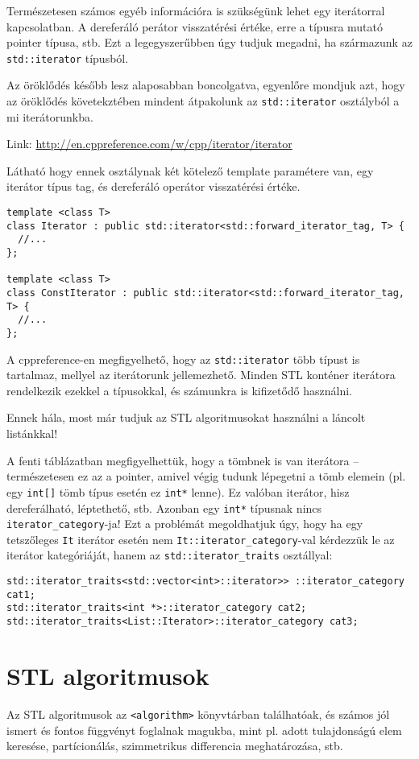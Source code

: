 \documentclass[../cpp_book/cpp_book.tex]{subfiles}
\begin{document}
	\smallskip
	Természetesen számos egyéb információra is szükségünk lehet egy iterátorral kapcsolatban. A dereferáló perátor visszatérési értéke, erre a típusra mutató pointer típusa, stb. Ezt a legegyszerűbben úgy tudjuk megadni, ha származunk az \texttt{std::iterator} típusból.
	\begin{note}
		Az öröklődés később lesz alaposabban boncolgatva, egyenlőre mondjuk azt, hogy az öröklődés követekztében mindent átpakolunk az \texttt{std::iterator} osztályból a mi iterátorunkba.
	\end{note}
	
	Link: \url{http://en.cppreference.com/w/cpp/iterator/iterator}
	\smallskip
	
	Látható hogy ennek osztálynak két kötelező template paramétere van, egy iterátor típus tag, és dereferáló operátor visszatérési értéke.
	
	\begin{lstlisting}
template <class T>
class Iterator : public std::iterator<std::forward_iterator_tag, T> {
  //...
};

template <class T>
class ConstIterator : public std::iterator<std::forward_iterator_tag, T> {
  //...
};
	\end{lstlisting}
	A cppreference-en megfigyelhető, hogy az \texttt{std::iterator} több típust is tartalmaz, mellyel az iterátorunk jellemezhető. Minden STL konténer iterátora rendelkezik ezekkel a típusokkal, és számunkra is kifizetődő használni.
	
	\smallskip
	Ennek hála, most már tudjuk az STL algoritmusokat használni a láncolt listánkkal!
	
	\smallskip
	A fenti táblázatban megfigyelhettük, hogy a tömbnek is van iterátora -- természetesen ez az a pointer, amivel végig tudunk lépegetni a tömb elemein (pl. egy \texttt{int[]} tömb típus esetén ez \texttt{int*} lenne). Ez valóban iterátor, hisz dereferálható, léptethető, stb. Azonban egy \texttt{int*} típusnak nincs \texttt{iterator\_category}-ja! Ezt a problémát megoldhatjuk úgy, hogy ha egy tetszőleges \texttt{It} iterátor esetén nem \texttt{It::iterator\_category}-val kérdezzük le az iterátor kategóriáját, hanem az \texttt{std::iterator\_traits} osztállyal:
	\begin{lstlisting}
std::iterator_traits<std::vector<int>::iterator>> ::iterator_category cat1;
std::iterator_traits<int *>::iterator_category cat2;
std::iterator_traits<List::Iterator>::iterator_category cat3;
	\end{lstlisting}
	\section{STL algoritmusok}
	Az STL algoritmusok az \texttt{<algorithm>} könyvtárban találhatóak, és számos jól ismert és fontos függvényt foglalnak magukba, mint pl. adott tulajdonságú elem keresése, partícionálás, szimmetrikus differencia meghatározása, stb.
	
\end{document}
